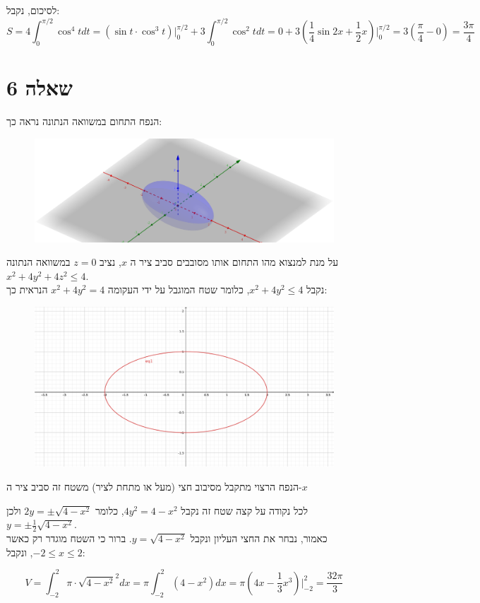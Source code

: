 \documentclass{article}
\begin{document}
לסיכום, נקבל:
\[
    S =
    4 \int_0^{\pi/2} \cos^4t dt =
    (\sin t \cdot \cos ^3 t)\bigg|_0^{\pi/2} + 3 \int_0^{\pi/2} \cos ^2t dt =
    0 + 3 (\frac{1}{4} \sin 2x + \frac{1}{2}x)\bigg|_0^{\pi/2} =
    3(\frac{\pi}{4} - 0) = \frac{3\pi}{4}
\]

\pagebreak

\section*{שאלה 6}

הנפח התחום במשוואה הנתונה נראה כך:
\begin{figure}[h]
    \centering
    \includegraphics[width=0.7\linewidth]{20475-assignment-12-06-3d.png}
\end{figure}

על מנת למנצוא מהו התחום אותו מסובבים סביב ציר ה $x$,
נציב $z=0$
במשוואה הנתונה $x^2+4y^2+4z^2\leq 4$. \\
נקבל $x^2+4y^2\leq 4$,
כלומר שטח המוגבל על ידי העקומה $x^2+4y^2=4$
הנראית כך:

\begin{figure}[h]
    \centering
    \includegraphics[width=0.7\linewidth]{20475-assignment-12-06-2d.png}
\end{figure}

הנפח הרצוי מתקבל מסיבוב חצי (מעל או מתחת לציר) משטח זה סביב ציר ה-$x$

לכל נקודה על קצה שטח זה נקבל $4y^2=4-x^2$,
כלומר $2y = \pm \sqrt{4-x^2}$
ולכן $y=\pm \frac{1}{2}\sqrt{4-x^2}$. \\
כאמור, נבחר את החצי העליון ונקבל $y=\sqrt{4-x^2}$.
ברור כי השטח מוגדר רק כאשר $-2\leq x \leq 2$,
ונקבל:

\[
    V = \int_{-2}^2 \pi \cdot \sqrt{4-x^2}^2dx =
    \pi \int_{-2}^2 (4-x^2)dx =
    \pi (4x-\frac{1}{3}x^3)\bigg|_{-2}^2 =
    \frac{32\pi}{3}
\]
\end{document}
